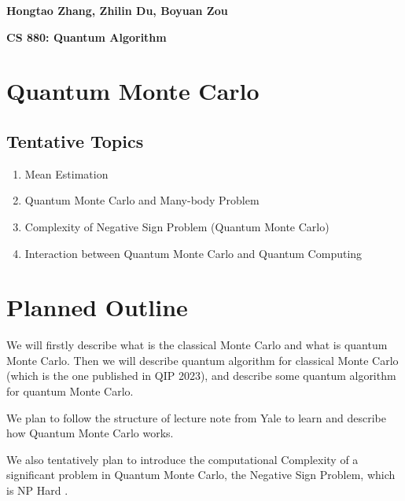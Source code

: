 \documentclass{article}%
\begin{document}
\begin{flushright}
    \textbf{Hongtao Zhang, Zhilin Du, Boyuan Zou \\}
\end{flushright}

\begin{center}
    \textbf{CS 880: Quantum Algorithm} \\
\end{center}

\section*{Quantum Monte Carlo}

\subsection*{Tentative Topics}

\begin{enumerate}
    \item Mean Estimation \cite{kothari2023mean, hamoudi2021quantum, montanaro2015quantum, HEINRICH20021}
    \item Quantum Monte Carlo and Many-body Problem \cite{ceperley1986quantum, boulder2003lecture}
    \item Complexity of Negative Sign Problem (Quantum Monte Carlo) \cite{troyer2005computational}
    \item Interaction between Quantum Monte Carlo and Quantum Computing \cite{huggins2022unbiasing, zhang2022quantum}
\end{enumerate}

\section*{Planned Outline}

We will firstly describe what is the classical Monte Carlo and what is quantum Monte Carlo.
Then we will describe quantum algorithm for classical Monte Carlo (which is the one published
in QIP 2023), and describe some quantum algorithm for quantum Monte Carlo.

We plan to follow the structure of lecture note from Yale \cite{boulder2003lecture} to learn and describe how Quantum Monte Carlo works.

We also tentatively plan to introduce the computational Complexity of a significant problem in 
Quantum Monte Carlo, the Negative Sign Problem, which is NP Hard \cite{troyer2005computational}.
\end{document}
